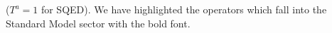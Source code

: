 \documentclass[paper,12pt]{revtex4}
\begin{document}
	($ T^a = 1 $ for SQED).
	We have highlighted the operators which fall into the 
	Standard Model sector with the bold font.






\end{document}
